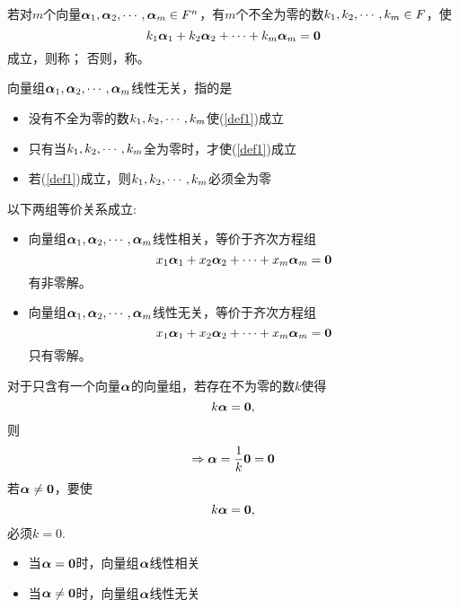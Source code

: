 \begin{dingyi}[线性相关与线性无关]
  若对$m$个向量$\boldsymbol{\alpha}_1,\boldsymbol{\alpha}_2,\cdots,\boldsymbol{\alpha}_m\in F^n$，有$m$个不全为零的数$k_1,k_2,\cdots,k_m\in F$，使
  \begin{equation}\label{def1}
    k_1\boldsymbol{\alpha}_1 + k_2\boldsymbol{\alpha}_2+\cdots + k_m\boldsymbol{\alpha}_m = \boldsymbol{0}        
  \end{equation}
  成立，则称；
  否则，称。
\end{dingyi}


\begin{zhu*}
  向量组$\boldsymbol{\alpha}_1,\boldsymbol{\alpha}_2,\cdots,\boldsymbol{\alpha}_m$线性无关，指的是
  \begin{itemize}
  \item 没有不全为零的数$k_1,k_2,\cdots,k_m$使(\ref{def1})成立 
  \item 只有当$k_1,k_2,\cdots,k_m$全为零时，才使(\ref{def1})成立 
  \item 若(\ref{def1})成立，则$k_1,k_2,\cdots,k_m$必须全为零
  \end{itemize}
\end{zhu*}



\begin{dingli}
  以下两组等价关系成立:
  \begin{itemize}
  \item  向量组$\boldsymbol{\alpha}_1,\boldsymbol{\alpha}_2,\cdots,\boldsymbol{\alpha}_m$线性相关，等价于齐次方程组
    $$
    x_1\boldsymbol{\alpha}_1+x_2\boldsymbol{\alpha}_2+\cdots+x_m\boldsymbol{\alpha}_m=\boldsymbol{0}
    $$
    有非零解。
  \item  向量组$\boldsymbol{\alpha}_1,\boldsymbol{\alpha}_2,\cdots,\boldsymbol{\alpha}_m$线性无关，等价于齐次方程组
    $$
    x_1\boldsymbol{\alpha}_1+x_2\boldsymbol{\alpha}_2+\cdots+x_m\boldsymbol{\alpha}_m=\boldsymbol{0}
    $$
    只有零解。
  \end{itemize}

\end{dingli}

对于只含有一个向量$\boldsymbol{\alpha}$的向量组，若存在不为零的数$k$使得
$$
k \boldsymbol{\alpha} = \boldsymbol{0},
$$
则
$$
\Rightarrow \boldsymbol{\alpha} = \frac1k \boldsymbol{0} = \boldsymbol{0}
$$  
若$\boldsymbol{\alpha}\ne \boldsymbol{0}$，要使
$$
k \boldsymbol{\alpha} = \boldsymbol{0},
$$
必须$k=0$.

\begin{itemize}
\item 当$\boldsymbol{\alpha}=\boldsymbol{0}$时，向量组$\boldsymbol{\alpha}$线性相关
\item 当$\boldsymbol{\alpha}\ne \boldsymbol{0}$时，向量组$\boldsymbol{\alpha}$线性无关
\end{itemize}



